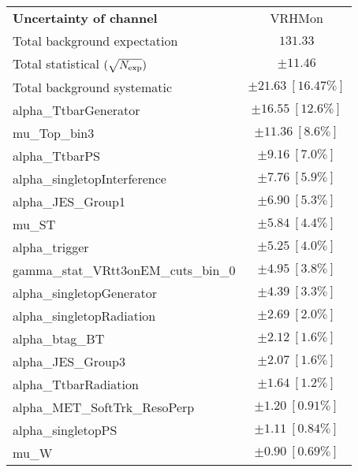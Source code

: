 
\begin{table}
\begin{center}
\setlength{\tabcolsep}{0.0pc}
\begin{tabular*}{\textwidth}{@{\extracolsep{\fill}}lc}
\noalign{\smallskip}\hline\noalign{\smallskip}
{\bf Uncertainty of channel}                                    & VRHMon           \\
\noalign{\smallskip}\hline\noalign{\smallskip}
Total background expectation             &  $131.33$       \\
\noalign{\smallskip}\hline\noalign{\smallskip}
Total statistical $(\sqrt{N_{\rm exp}})$              & $\pm 11.46$       \\
Total background systematic               & $\pm 21.63\ [16.47\%] $             \\
\noalign{\smallskip}\hline\noalign{\smallskip}
\noalign{\smallskip}\hline\noalign{\smallskip}
alpha\_TtbarGenerator         & $\pm 16.55\ [12.6\%] $       \\
mu\_Top\_bin3         & $\pm 11.36\ [8.6\%] $       \\
alpha\_TtbarPS         & $\pm 9.16\ [7.0\%] $       \\
alpha\_singletopInterference         & $\pm 7.76\ [5.9\%] $       \\
alpha\_JES\_Group1         & $\pm 6.90\ [5.3\%] $       \\
mu\_ST         & $\pm 5.84\ [4.4\%] $       \\
alpha\_trigger         & $\pm 5.25\ [4.0\%] $       \\
gamma\_stat\_VRtt3onEM\_cuts\_bin\_0         & $\pm 4.95\ [3.8\%] $       \\
alpha\_singletopGenerator         & $\pm 4.39\ [3.3\%] $       \\
alpha\_singletopRadiation         & $\pm 2.69\ [2.0\%] $       \\
alpha\_btag\_BT         & $\pm 2.12\ [1.6\%] $       \\
alpha\_JES\_Group3         & $\pm 2.07\ [1.6\%] $       \\
alpha\_TtbarRadiation         & $\pm 1.64\ [1.2\%] $       \\
alpha\_MET\_SoftTrk\_ResoPerp         & $\pm 1.20\ [0.91\%] $       \\
alpha\_singletopPS         & $\pm 1.11\ [0.84\%] $       \\
mu\_W         & $\pm 0.90\ [0.69\%] $       \\

\end{tabular*}
\end{center}
\end{table}
